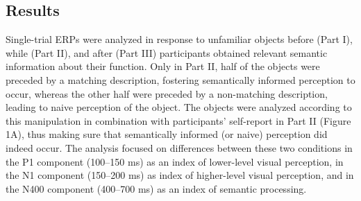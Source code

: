 \documentclass[
  english,
  man,11pt,floatsintext]{apa7}
\begin{document}
\hypertarget{results}{%
\subsection{Results}\label{results}}

Single-trial ERPs were analyzed in response to unfamiliar objects before (Part I), while (Part II), and after (Part III) participants obtained relevant semantic information about their function. Only in Part II, half of the objects were preceded by a matching description, fostering semantically informed perception to occur, whereas the other half were preceded by a non-matching description, leading to naive perception of the object. The objects were analyzed according to this manipulation in combination with participants' self-report in Part II (Figure 1A), thus making sure that semantically informed (or naive) perception did indeed occur. The analysis focused on differences between these two conditions in the P1 component (100--150 ms) as an index of lower-level visual perception, in the N1 component (150--200 ms) as index of higher-level visual perception, and in the N400 component (400--700 ms) as an index of semantic processing.
\end{document}
